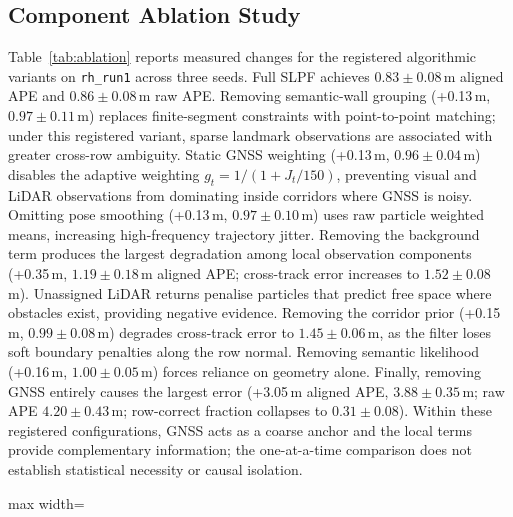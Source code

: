 \documentclass[letterpaper, 10 pt, conference]{ieeeconf}
\begin{document}
\subsection{Component Ablation Study}
Table~\ref{tab:ablation} reports measured changes for the registered algorithmic variants on \texttt{rh\_run1} across three seeds. Full SLPF achieves $0.83\pm0.08\,$m aligned APE and $0.86\pm0.08\,$m raw APE.
Removing semantic-wall grouping (+0.13\,m, $0.97\pm0.11\,$m) replaces finite-segment constraints with point-to-point matching; under this registered variant, sparse landmark observations are associated with greater cross-row ambiguity.
Static GNSS weighting (+0.13\,m, $0.96\pm0.04\,$m) disables the adaptive weighting $g_t=1/(1+J_t/150)$, preventing visual and LiDAR observations from dominating inside corridors where GNSS is noisy.
Omitting pose smoothing (+0.13\,m, $0.97\pm0.10\,$m) uses raw particle weighted means, increasing high-frequency trajectory jitter.
Removing the background term produces the largest degradation among local observation components (+0.35\,m, $1.19\pm0.18\,$m aligned APE; cross-track error increases to $1.52\pm0.08\,$m). Unassigned LiDAR returns penalise particles that predict free space where obstacles exist, providing negative evidence.
Removing the corridor prior (+0.15\,m, $0.99\pm0.08\,$m) degrades cross-track error to $1.45\pm0.06\,$m, as the filter loses soft boundary penalties along the row normal.
Removing semantic likelihood (+0.16\,m, $1.00\pm0.05\,$m) forces reliance on geometry alone.
Finally, removing GNSS entirely causes the largest error (+3.05\,m aligned APE, $3.88\pm0.35\,$m; raw APE $4.20\pm0.43\,$m; row-correct fraction collapses to $0.31\pm0.08$). Within these registered configurations, GNSS acts as a coarse anchor and the local terms provide complementary information; the one-at-a-time comparison does not establish statistical necessity or causal isolation.

\begin{table}[t]
  \centering
  \caption{Localisation performance under perception occlusions, landmark decimation, and map noise, pooled across \texttt{rh\_run1} and \texttt{rh\_run2} over seeds 11, 22, and 33.}
  \footnotesize
  \setlength{\tabcolsep}{2.5pt}
  \begin{adjustbox}{max width=\columnwidth}
    
  \end{adjustbox}
  \label{tab:robustness}
\end{table}
\end{document}
